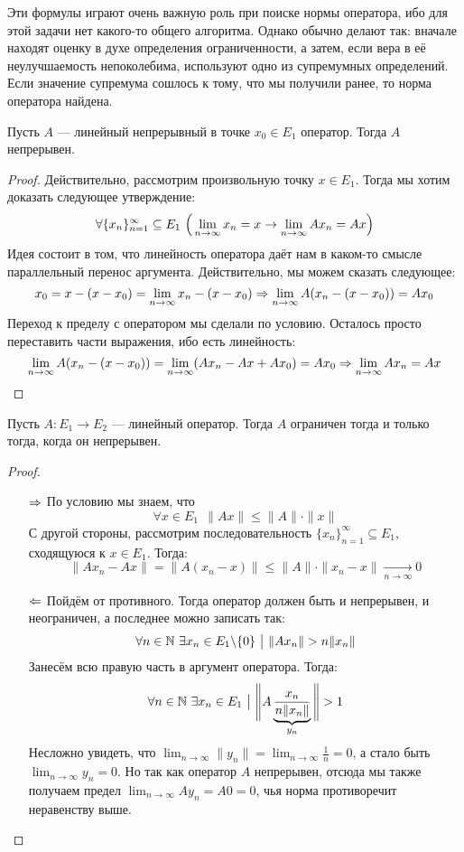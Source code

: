 \begin{note}
	Эти формулы играют очень важную роль при поиске нормы оператора, ибо для этой задачи нет какого-то общего алгоритма. Однако обычно делают так: вначале находят оценку в духе определения ограниченности, а затем, если вера в её неулучшаемость непоколебима, используют одно из супремумных определений. Если значение супремума сошлось к тому, что мы получили ранее, то норма оператора найдена.
\end{note}

\begin{proposition}
	Пусть $A$ --- линейный непрерывный в точке $x_0 \in E_1$ оператор. Тогда $A$ непрерывен.
\end{proposition}

\begin{proof}
	Действительно, рассмотрим произвольную точку $x \in E_1$. Тогда мы хотим доказать следующее утверждение:
	\[
		\forall \{x_n\}_{n = 1}^\infty \subseteq E_1\ \Big(\lim_{n \to \infty} x_n = x \ra \lim_{n \to \infty} Ax_n = Ax\Big)
	\]
	Идея состоит в том, что линейность оператора даёт нам в каком-то смысле параллельный перенос аргумента. Действительно, мы можем сказать следующее:
	\[
		x_0 = x - (x - x_0) = \lim_{n \to \infty} x_n - (x - x_0) \Rightarrow \lim_{n \to \infty} A(x_n - (x - x_0)) = Ax_0
	\]
	Переход к пределу с оператором мы сделали по условию. Осталось просто переставить части выражения, ибо есть линейность:
	\[
		\lim_{n \to \infty} A(x_n - (x - x_0)) = \lim_{n \to \infty} (Ax_n - Ax + Ax_0) = Ax_0 \Rightarrow \lim_{n \to \infty} Ax_n = Ax
	\]
\end{proof}

\begin{theorem}
	Пусть $A \colon E_1 \to E_2$ --- линейный оператор. Тогда $A$ ограничен тогда и только тогда, когда он непрерывен.
\end{theorem}

\begin{proof}~
	\begin{itemize}
		\item[$\Rightarrow$] По условию мы знаем, что
		\[
			\forall x \in E_1\ \ \|Ax\| \le \|A\| \cdot \|x\|
		\]
		С другой стороны, рассмотрим последовательность $\{x_n\}_{n = 1}^\infty \subseteq E_1$, сходящуюся к $x \in E_1$. Тогда:
		\[
			\|Ax_n - Ax\| = \|A(x_n - x)\| \le \|A\| \cdot \|x_n - x\| \xrightarrow[n \to \infty]{} 0
		\]
		
		\item[$\Leftarrow$] Пойдём от противного. Тогда оператор должен быть и непрерывен, и неограничен, а последнее можно записать так:
		\[
			\forall n \in \mathbb{N}\ \exists x_n \in E_1 \backslash \{0\} \ \big|\  \|Ax_n\| > n\|x_n\|
		\]
		Занесём всю правую часть в аргумент оператора. Тогда:
		\[
			\forall n \in \mathbb{N}\ \exists x_n \in E_1 \ \big|\  \Bigg\|A\underbrace{\frac{x_n}{n\|x_n\|}}_{y_n}\Bigg\| > 1
		\]
		Несложно увидеть, что $\lim_{n \to \infty} \|y_n\| = \lim_{n \to \infty} \frac{1}{n} = 0$, а стало быть $\lim_{n \to \infty} y_n = 0$. Но так как оператор $A$ непрерывен, отсюда мы также получаем предел $\lim_{n \to \infty} Ay_n = A0 = 0$, чья норма противоречит неравенству выше.
	\end{itemize}
\end{proof}

